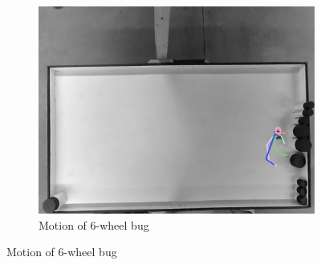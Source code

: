 \begin{figure}
\begin{subfigure}[t]{0.3\textwidth}
		\includegraphics[width=\textwidth]{../hardwareX_paper/robot_6.png}
		\caption{Motion of 6-wheel bug}
	\end{subfigure}
	

\end{figure}
